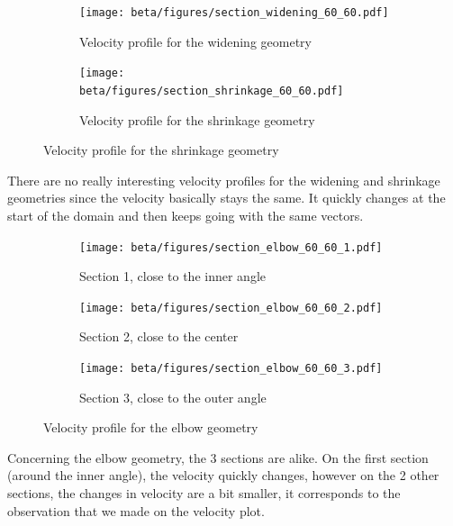 \begin{figure}[htbp]
      \centering
      \begin{subfigure}{.45\textwidth}
            \centering
            \texttt{[image: beta/figures/section\_widening\_60\_60.pdf]}
            \caption{Velocity profile for the widening geometry}   
      \end{subfigure}
      \begin{subfigure}{.45\textwidth}
            \centering
            \texttt{[image: beta/figures/section\_shrinkage\_60\_60.pdf]}
            \caption{Velocity profile for the shrinkage geometry}   
      \end{subfigure}
\end{figure}

There are no really interesting velocity profiles for the widening and
shrinkage geometries since the velocity basically stays the same. It quickly
changes at the start of the domain and then keeps going with the same vectors.

\begin{figure}[htbp]
      \centering
      \begin{subfigure}{.45\textwidth}
            \centering
            \texttt{[image: beta/figures/section\_elbow\_60\_60\_1.pdf]}
            \caption{Section 1, close to the inner angle}   
      \end{subfigure}
      \begin{subfigure}{.45\textwidth}
            \centering
            \texttt{[image: beta/figures/section\_elbow\_60\_60\_2.pdf]}
            \caption{Section 2, close to the center}   
      \end{subfigure}

      \begin{subfigure}{.45\textwidth}
            \centering
            \texttt{[image: beta/figures/section\_elbow\_60\_60\_3.pdf]}
            \caption{Section 3, close to the outer angle} 
      \end{subfigure}
      \caption{Velocity profile for the elbow geometry}
\end{figure}

Concerning the elbow geometry, the 3 sections are alike. On the first section
(around the inner angle), the velocity quickly changes, however on the 2 other
sections, the changes in velocity are a bit smaller, it corresponds to the
observation that we made on the velocity plot.

